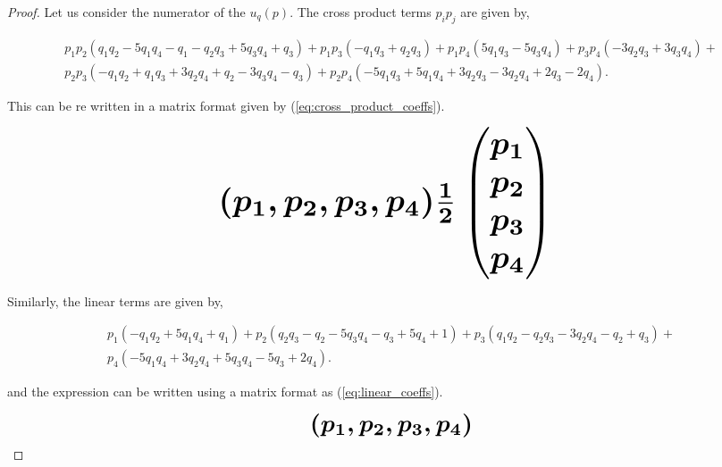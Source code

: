 \begin{proof}
Let us consider the numerator of the \(u_q(p)\). The cross product terms \(p_ip_j\)
are given by,

\begingroup
\footnotesize
\begin{align*}
p_{1} p_{2} (q_{1} q_{2} - 5 q_{1} q_{4} - q_{1} - q_{2} q_{3} + 5 q_{3} q_{4}
+ q_{3}) + p_{1} p_{3} (- q_{1} q_{3} + q_{2} q_{3}) + p_{1} p_{4} (5 q_{1} q_{3} -
5 q_{3} q_{4}) + p_{3} p_{4} (- 3 q_{2} q_{3} + 3 q_{3} q_{4}) +  \\
p_{2} p_{3} (- q_{1} q_{2} + q_{1} q_{3} + 3 q_{2} q_{4} + q_{2} - 3 q_{3} q_{4} - q_{3}) +
p_{2} p_{4} (- 5 q_{1} q_{3} + 5 q_{1} q_{4} + 3 q_{2} q_{3} - 3 q_{2} q_{4} +
2 q_{3} - 2 q_{4}).
\end{align*}
\endgroup

This can be re written in a matrix format given by (\ref{eq:cross_product_coeffs}).

\begin{equation}\label{eq:cross_product_coeffs}
    \resizebox{0.8\linewidth}{!}{\arraycolsep=2.5pt%
    \boldmath\( 
    (p_1, p_2, p_3, p_4) \frac{1}{2}  \begin{pmatrix} 
    p_1 \\
    p_2 \\
    p_3 \\
    p_4 \end{pmatrix}
    \) }
\end{equation}

Similarly, the linear terms are given by,

\begingroup
\footnotesize
\begin{align*}
p_{1} (- q_{1} q_{2} + 5 q_{1} q_{4} + q_{1}) + p_{2} (q_{2} q_{3} - q_{2} - 5 q_{3} q_{4} - q_{3} + 5 q_{4} + 1) + p_{3} (q_{1} q_{2} - q_{2} q_{3} - 3 q_{2} q_{4} - q_{2} + q_{3}) + \\
p_{4} (- 5 q_{1} q_{4} + 3 q_{2} q_{4} + 5 q_{3} q_{4} - 5 q_{3} + 2 q_{4}).
\end{align*}
\endgroup

and the expression can be written using a matrix format as (\ref{eq:linear_coeffs}).

\begin{equation}\label{eq:linear_coeffs}
    \resizebox{0.38\linewidth}{!}{\arraycolsep=2.5pt%
    \boldmath\(
    (p_1, p_2, p_3, p_4) \)}
\end{equation}


\end{proof}
